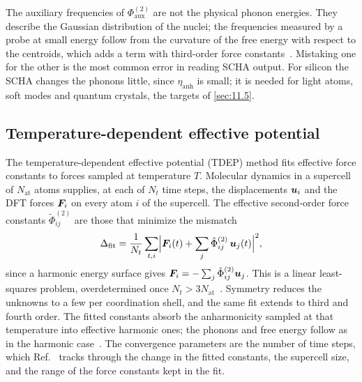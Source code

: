 The auxiliary frequencies of $\Phi^{(2)}_{\mathrm{aux}}$ are not the physical phonon energies. They describe the Gaussian distribution of the nuclei; the frequencies measured by a probe at small energy follow from the curvature of the free energy with respect to the centroids, which adds a term with third-order force constants~\cite[Sect.~IV]{monacelli2021stochastic}. Mistaking one for the other is the most common error in reading SCHA output. For silicon the SCHA changes the phonons little, since $\eta_{\mathrm{anh}}$ is small; it is needed for light atoms, soft modes and quantum crystals, the targets of \cref{sec:11.5}.

\subsection{Temperature-dependent effective potential}

The temperature-dependent effective potential (TDEP) method fits effective force constants to forces sampled at temperature $T$. Molecular dynamics in a supercell of $N_{\mathrm{at}}$ atoms supplies, at each of $N_t$ time steps, the displacements $\bm{u}_i$ and the DFT forces $\bm{F}_i$ on every atom $i$ of the supercell. The effective second-order force constants $\tilde\Phi^{(2)}_{ij}$ are those that minimize the mismatch
\begin{equation}
  \Delta_{\mathrm{fit}} = \frac{1}{N_t}\sum_{t,i}\Bigl|\bm{F}_{i}(t) + \sum_j\tilde\Phi^{(2)}_{ij}\,\bm{u}_j(t)\Bigr|^2 ,
  \label{eq:E.8-tdep}
\end{equation}
since a harmonic energy surface gives $\bm{F}_i = -\sum_j\tilde\Phi^{(2)}_{ij}\bm{u}_j$. This is a linear least-squares problem, overdetermined once $N_t > 3N_{\mathrm{at}}$~\cite[Eq.~(3), with the opposite sign convention for the force constants]{hellman2011lattice}. Symmetry reduces the unknowns to a few per coordination shell, and the same fit extends to third and fourth order. The fitted constants absorb the anharmonicity sampled at that temperature into effective harmonic ones; the phonons and free energy follow as in the harmonic case~\cite{hellman2013temperature}. The convergence parameters are the number of time steps, which Ref.~\cite[Fig.~1]{hellman2011lattice} tracks through the change in the fitted constants, the supercell size, and the range of the force constants kept in the fit.

